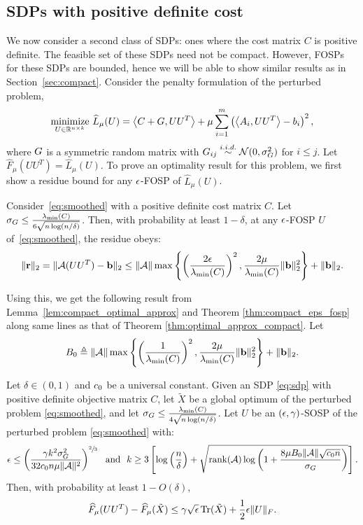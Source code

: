 \subsection{SDPs with positive definite cost}\label{sec:pd}
We now consider a second class of SDPs: ones where the cost matrix $C$ is positive definite. The feasible set of these SDPs need not be compact. However, FOSPs for these SDPs are bounded, hence we will be able to show similar results as in Section~\ref{sec:compact}. Consider the penalty formulation of the perturbed problem,
\begin{align}
\underset{U \in \mathbb{R}^{n \times k}}{\text{minimize}} ~ \widehat L_{\mu}(U) =  \left\langle C+G, UU^T \right\rangle+\mu \sum_{i=1}^m \left(\left\langle A_i, UU^T \right\rangle - b_i\right)^2,
\label{eq:smoothed}
\end{align}
where $G$ is a symmetric random matrix with $G_{ij} \stackrel{i.i.d.}{\sim} \mathcal{N}(0,\sigma_G^2)$ for $i\leq j$. Let $\widehat F_{\mu}(UU^T) = \widehat L_{\mu} (U)$. To prove an optimality result for this problem, we first show a residue bound for any $\epsilon$-FOSP of $\widehat L_{\mu}(U)$.
\begin{lemma}\label{lem:residues}
Consider~\eqref{eq:smoothed} with a positive definite cost matrix $C$. Let $\sigma_G \leq \frac{\lambda_{\min}(C)}{6\sqrt{n \log(n/ \delta)}}$. Then, with probability at least $1-\delta$, at any $\epsilon$-FOSP $U$ of~\eqref{eq:smoothed}, the residue obeys:
$$
	\|\mathbf{r}\|_2 =\|\mathcal{A}(UU^T) -\mathbf{b}\|_2 \leq \|\mathcal{A}\| \max \left \{ \left( \frac{2\epsilon} {\lambda_{\min}(C)}\right)^2, \frac{2\mu}{\lambda_{\min}(C)} \|\mathbf{b}\|_2^2 \right \}+\|\mathbf{b}\|_2.
$$ 
\end{lemma}


Using this, we get the following result from Lemma~\ref{lem:compact_optimal_approx} and Theorem \ref{thm:compact_eps_fosp}  along same lines as that of Theorem \ref{thm:optimal_approx_compact}.
Let $$B_0 \triangleq \|\mathcal{A}\| \max \left \{ \left( \frac{1} {\lambda_{\min}(C)}\right)^2, \frac{2\mu}{\lambda_{\min}(C)} \|\mathbf{b}\|_2^2 \right \}+\|\mathbf{b}\|_2.$$
\begin{theorem}\label{thm:optimal_approx}
Let $\delta \in (0, 1)$ and $c_0$ be a universal constant. Given an SDP \eqref{eq:sdp} with positive definite objective matrix $C$, let $\tilde X $ be a global optimum of the perturbed problem \eqref{eq:smoothed}, and let $\sigma_G \leq \frac{\lambda_{\min}(C)}{4\sqrt{n \log(n/ \delta)}}$. Let $U$ be an $(\epsilon, \gamma)$-SOSP of the perturbed problem \eqref{eq:smoothed} with:
\begin{align*}
	\epsilon \leq \left(\frac{\gamma k^2 \sigma_G^2 }{ 32c_0 n  \mu \|\mathcal{A}\|^2}\right)^{\sfrac{2}{3}} ~\text{ and }~ k \geq 3\left[\log\left(\frac{n}{\delta}\right) + \sqrt{ \operatorname{rank}(\mathcal{A})   \log \left(1 +\frac{8 \mu B_0\|\mathcal{A}\|\sqrt{c_0 n} }{\sigma_G }  \right) }  \right].
\end{align*}
Then, with probability at least $1-O(\delta)$,
\begin{align*}
	\widehat F_{\mu}(UU^T)  - \widehat F_{\mu}(\tilde X)  \leq \gamma \sqrt{\epsilon} \operatorname{Tr}(\tilde X) +\frac{1}{2}\epsilon \|U\|_F.
\end{align*}
\end{theorem}

